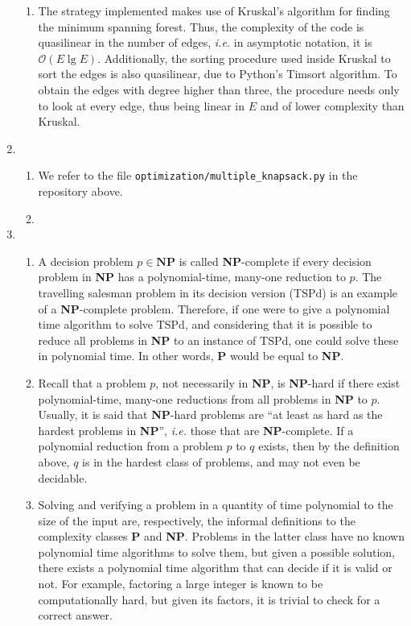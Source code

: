 \documentclass[12pt]{article}
\begin{document}
\begin{enumerate}
\begin{enumerate}
    \item The strategy implemented makes use of Kruskal's algorithm for finding the minimum spanning forest. Thus, the complexity of the code is quasilinear in the number of edges, \emph{i.e.} in asymptotic notation, it is $\mathcal{O}(E \lg E)$. Additionally, the sorting procedure used inside Kruskal to sort the edges is also quasilinear, due to Python's Timsort algorithm. To obtain the edges with degree higher than three, the procedure needs only to look at every edge, thus being linear in $E$ and of lower complexity than Kruskal.
  \end{enumerate}
  \item
  \begin{enumerate}
    \item We refer to the file \texttt{optimization/multiple\_knapsack.py} in the repository above.
    \item 
  \end{enumerate}
  \item 
  \begin{enumerate}
    \item A decision problem $p \in \mathbf{NP}$ is called \textbf{NP}-complete if every decision problem in \textbf{NP} has a polynomial-time, many-one reduction to $p$. The travelling salesman problem in its decision version (TSPd) is an example of a \textbf{NP}-complete problem. Therefore, if one were to give a polynomial time algorithm to solve TSPd, and considering that it is possible to reduce all problems in \textbf{NP} to an instance of TSPd, one could solve these in polynomial time. In other words, \textbf{P} would be equal to \textbf{NP}.
    \item Recall that a problem $p$, not necessarily in \textbf{NP}, is \textbf{NP}-hard if there exist polynomial-time, many-one reductions from all problems in \textbf{NP} to $p$. Usually, it is said that \textbf{NP}-hard problems are ``at least as hard as the hardest problems in \textbf{NP}'', \emph{i.e.} those that are \textbf{NP}-complete. If a polynomial reduction from a problem $p$ to $q  $ exists, then by the definition above, $q$ is in the hardest class of problems, and may not even be decidable.
    \item Solving and verifying a problem in a quantity of time polynomial to the size of the input are, respectively, the informal definitions to the complexity classes \textbf{P} and \textbf{NP}. Problems in the latter class have no known polynomial time algorithms to solve them, but given a possible solution, there exists a polynomial time algorithm that can decide if it is valid or not. For example, factoring a large integer is known to be computationally hard, but given its factors, it is trivial to check for a correct answer.

\end{enumerate}
\end{enumerate}
\end{document}
